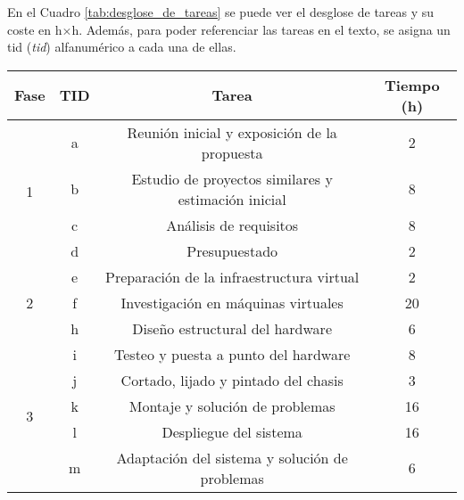 En el Cuadro \ref{tab:desglose_de_tareas} se puede ver el desglose de tareas y su coste en h$\times$h. Además, para poder referenciar las tareas en el texto, se asigna un \acrshort{tid} (\textit{\acrlong{tid}}) alfanumérico a cada una de ellas. 
\begin{table}[htpb]
  \centering
  \begin{tabular}{ |c|c|c|c| }
  \hline
  \textbf{Fase} & \textbf{TID} & \textbf{Tarea} & \textbf{Tiempo (h)} \\ 
  \hline
  \multirow{4}{*}{1}        & a     & {Reunión inicial y exposición de la propuesta}                            & 2 \\\cline{2-4}
                            & b     & {Estudio de proyectos similares y estimación inicial}                     & 8 \\\cline{2-4}
                            & c     & {Análisis de requisitos}                                                  & 8 \\\cline{2-4}
                            & d     & {Presupuestado}                                                           & 2 \\
  \hline
  \multirow{3}{*}{2}        & e     & {Preparación de la infraestructura virtual}                               & 2 \\\cline{2-4}
                            & f     & {Investigación en máquinas virtuales}                                     & 20 \\\cline{2-4}
                            & h     & {Diseño estructural del hardware}                                         & 6 \\
  \hline
  \multirow{5}{*}{3}        & i     & {Testeo y puesta a punto del hardware}                                     & 8 \\\cline{2-4}
                            & j     & {Cortado, lijado y pintado del chasis}                                    & 3 \\\cline{2-4}
                            & k     & {Montaje y solución de problemas}                                         & 16 \\\cline{2-4}
                            & l     & {Despliegue del sistema}                                                  & 16 \\\cline{2-4}
                            & m     & {Adaptación del sistema y solución de problemas}                          & 6 \\
  \hline

\end{tabular}
\end{table}
